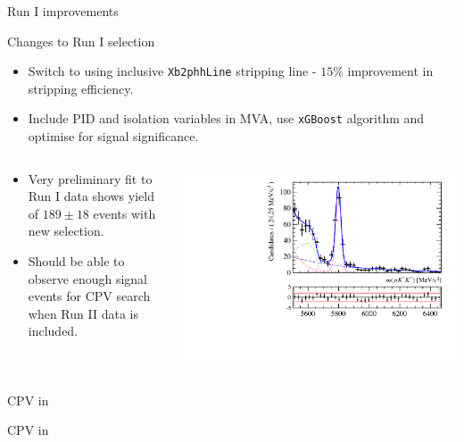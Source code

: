 \documentclass{beamer}
\begin{document}
\begin{frame}{ Run I improvements}
  \small
  \begin{block}{Changes to Run I selection}
    \begin{itemize}
    \item Switch to using inclusive \texttt{Xb2phhLine} stripping line - $15\%$ improvement in stripping efficiency.
    \item Include PID and isolation variables in MVA, use \texttt{xGBoost} algorithm and optimise for signal significance.
    \end{itemize}
  \end{block}
  \begin{columns}
    \begin{column}{.5\textwidth}
      \begin{itemize}
      \item Very preliminary fit to Run I data shows yield of $189\pm18$ events with new selection.
      \item Should be able to observe enough signal events for CPV search when Run II data is included.
      \end{itemize}
    \end{column}
    \begin{column}{.5\textwidth}
      \includegraphics[width=\textwidth]{Xib2KKp_data.pdf}
    \end{column}
  \end{columns}
\end{frame}

\begin{frame}{CPV in }
  \begin{block}{}
    \begin{center}
      \Huge CPV in 
    \end{center}
  \end{block}
\end{frame}
\end{document}
